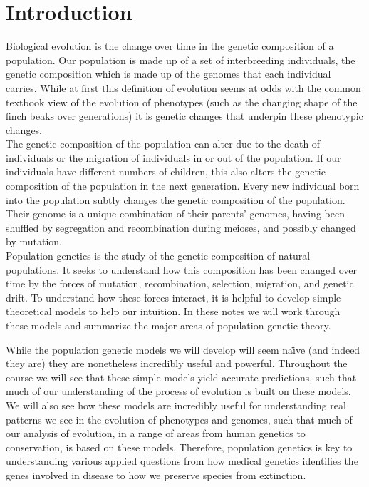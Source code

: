 \chapter{Introduction}
 Biological evolution is the change over time in the genetic composition of a population.\cite{DobzhanskyBook} Our population is made up of a set of interbreeding individuals, the genetic composition which is made up of the  genomes that each individual carries.  While at first this definition of evolution seems at odds with the
common textbook view of the evolution of phenotypes (such as the changing shape
of the finch beaks over generations) it is genetic changes that underpin these
phenotypic changes.  \\

The genetic composition of the population can alter due to the death of individuals or the migration of individuals in or out
of the population. If our individuals have different numbers of children, this
also alters the genetic composition of the population in the next generation.
Every new individual born into the population subtly changes the genetic
composition of the population. Their genome is a unique combination of their
parents' genomes, having been shuffled by segregation and recombination during
meioses, and possibly changed by mutation. \\

Population genetics is the study of the genetic composition of natural
populations. It seeks to understand how this composition has been changed over
time by the forces of mutation, recombination, selection, migration, and
genetic drift.  To understand how these forces interact, it is helpful to
develop simple theoretical models to help our intuition. In these notes we will
work through these models and summarize the major areas of population genetic
theory.



While the population genetic models we will develop will seem na\"{\i}ve (and indeed they are) they are
nonetheless incredibly useful and powerful. Throughout the course we will see
that these simple models yield accurate predictions, such that much of our
understanding of the process of evolution is built on these models. We will
also see how these models are incredibly useful for understanding real patterns
we see in the evolution of phenotypes and genomes, such that much of our
analysis of evolution, in a range of areas from human genetics to conservation,
is based on these models. Therefore, population genetics is key to
understanding various applied questions from how medical genetics identifies
the genes involved in disease to how we preserve species from extinction. 


